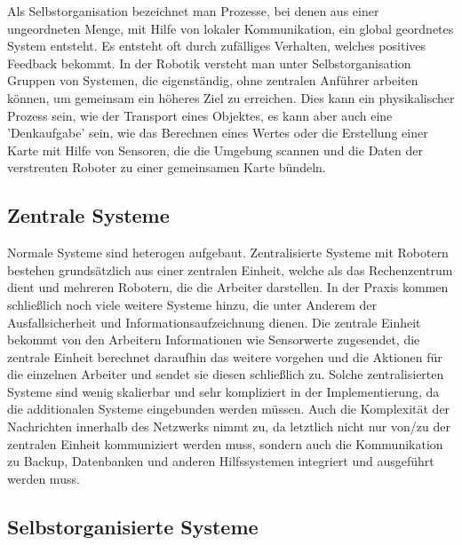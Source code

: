 Als Selbstorganisation bezeichnet man Prozesse, bei denen aus einer ungeordneten Menge, mit Hilfe von lokaler Kommunikation, ein global geordnetes System entsteht.
Es entsteht oft durch zufälliges Verhalten, welches positives Feedback bekommt.
In der Robotik versteht man unter Selbstorganisation Gruppen von Systemen, die eigenständig, ohne zentralen Anführer arbeiten können, um gemeinsam ein höheres Ziel zu erreichen. Dies kann ein physikalischer Prozess sein, wie der Transport eines Objektes, es kann aber auch eine 'Denkaufgabe' sein, wie das Berechnen eines Wertes oder die Erstellung einer Karte mit Hilfe von Sensoren, die die Umgebung scannen und die Daten der verstreuten Roboter zu einer gemeinsamen Karte bündeln.

\subsection*{Zentrale Systeme}\label{subsec:ZentraleSysteme}

Normale Systeme sind heterogen aufgebaut.
Zentralisierte Systeme mit Robotern bestehen grundsätzlich aus einer zentralen Einheit, welche als das Rechenzentrum dient und mehreren Robotern, die die Arbeiter darstellen.
In der Praxis kommen schließlich noch viele weitere Systeme hinzu, die unter Anderem der Ausfallsicherheit und Informationsaufzeichnung dienen.
Die zentrale Einheit bekommt von den Arbeitern Informationen wie Sensorwerte zugesendet, die zentrale Einheit berechnet daraufhin das weitere vorgehen und die Aktionen für die einzelnen Arbeiter und sendet sie diesen schließlich zu.
Solche zentralisierten Systeme sind wenig skalierbar und sehr kompliziert in der Implementierung, da die additionalen Systeme eingebunden werden müssen.
Auch die Komplexität der Nachrichten innerhalb des Netzwerks nimmt zu, da letztlich nicht nur von/zu der zentralen Einheit kommuniziert werden muss, sondern auch die Kommunikation zu Backup, Datenbanken und anderen Hilfssystemen integriert und ausgeführt werden muss.

\subsection*{Selbstorganisierte Systeme}\label{subsec:SelbstorganisierteSysteme}

